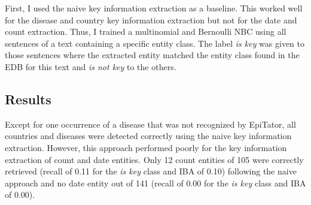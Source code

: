   First, I used the naive key information extraction as a baseline.
  This worked well for the disease and country key information extraction but not for the date and count extraction.
  Thus, I trained a multinomial and Bernoulli NBC using all sentences of a text containing a specific entity class.
  The label \textsl{is key} was given to those sentences where the extracted entity matched the entity class found in the EDB for this text and \textsl{is not key} to the others.

\subsection{Results}\label{result keywords}
  Except for one occurrence of a disease that was not recognized by EpiTator, all countries and diseases were detected correctly using the naive key information extraction.
  However, this approach performed poorly for the key information extraction of count and date entities. Only 12 count entities of 105 were correctly retrieved (recall of 0.11 for the \textsl{is key} class and IBA of 0.10) following the naive approach and no date entity out of 141 (recall of 0.00 for the \textsl{is key} class and IBA of 0.00).

